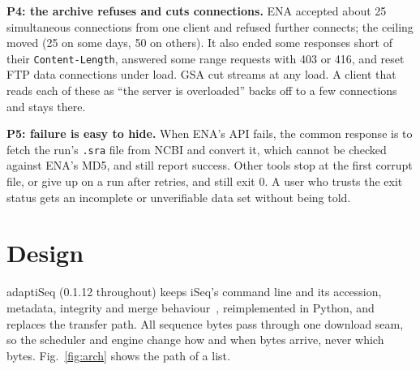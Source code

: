 \documentclass[conference]{IEEEtran}
\begin{document}
\textbf{P4: the archive refuses and cuts connections.} ENA accepted about 25 simultaneous connections from one client and refused further connects; the ceiling moved (25 on some days, 50 on others). It also ended some responses short of their \texttt{Content-Length}, answered some range requests with 403 or 416, and reset FTP data connections under load. GSA cut streams at any load. A client that reads each of these as ``the server is overloaded'' backs off to a few connections and stays there.

\textbf{P5: failure is easy to hide.} When ENA's API fails, the common response is to fetch the run's \texttt{.sra} file from NCBI and convert it, which cannot be checked against ENA's MD5, and still report success. Other tools stop at the first corrupt file, or give up on a run after retries, and still exit 0. A user who trusts the exit status gets an incomplete or unverifiable data set without being told.

\section{Design}\label{sec:design}
adaptiSeq (0.1.12 throughout) keeps iSeq's command line and its accession, metadata, integrity and merge behaviour~\cite{iseq}, reimplemented in Python, and replaces the transfer path. All sequence bytes pass through one download seam, so the scheduler and engine change how and when bytes arrive, never which bytes. Fig.~\ref{fig:arch} shows the path of a list.
\end{document}
